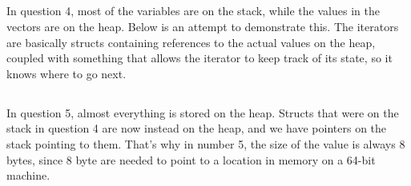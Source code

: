 \subsection{}
In question 4, most of the variables are on the stack, while the values in the
vectors are on the heap. Below is an attempt to demonstrate this. The iterators
are basically structs containing references to the actual values on the heap,
coupled with something that allows the iterator to keep track of its state, so
it knows where to go next.



\subsection{}
In question 5, almost everything is stored on the heap.
Structs that were on the stack in question 4 are now instead on the heap, and we
have pointers on the stack pointing to them. That's why in number 5, the
size of the value is always 8 bytes, since 8 byte are needed to point to a
location in memory on a 64-bit machine.


